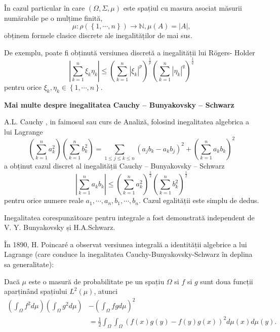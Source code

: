 \documentclass[a4paper,12pt,oneside]{report}
\begin{document}
	În  cazul particular în care \(\left ( \Omega , \Sigma, \mu \right )\) este spațiul cu masura asociat măsurii numărabile pe o mulțime finită, \[\mu  : \rho \left ( \left \{ 1,\cdots, n \right \} \right )\rightarrow \mathbb{N}, \mu \left ( A \right ) = \left | A \right |,\]
obținem formele clasice discrete ale inegalităților de mai sus.

De exemplu, poate fi obținută versiunea discretă a inegalității lui R\"{o}gers- Holder
\begin{displaymath}
  \left | \sum_{k=1}^{n} \xi _{k}\eta _{k}\right |\leq \left ( \sum_{k = 1}^{n}\left | \xi _{k}\right |^{p}  \right )^{\frac{1}{p}}\left ( \sum_{k = 1}^{n} \left | \eta _{k} \right |^{q}\right )^{\frac{1}{q}}
\end{displaymath}
pentru  orice \(\xi _{k}, \eta _{k} \in \left \{ 1,\cdots,n \right \}.\)




\textbf{Mai multe despre inegalitatea Cauchy – Bunyakovsky – Schwarz}

A.L. Cauchy , in faimosul sau curs de Analiză, folosind inegalitatea algebrica a  lui Lagrange
\begin{displaymath}
  \left ( \sum_{k = 1}^{n} a_{k}^{2}\right )\left ( \sum_{k = 1}^{n} b_{k}^{2}\right ) =  \sum_{1\leq j\leq k\leq n}\left ( a_{j}b_{k} - a_{k}b_{j} \right )^{2} + \left ( \sum_{k = 1}^{n} a_{k}b_{k}\right )^{2}
\end{displaymath}
a obținut cazul discret al inegalității Cauchy – Bunyakovsky – Schwarz
\begin{displaymath}
  \left | \sum_{k = 1}^{n} a_{k}b_{k} \right |\leq \left ( \sum_{k = 1}^{n}a_{k}^{2} \right )^{\frac{1}{2}}\left ( \sum_{k = 1}^{n}b_{k}^{2} \right )^{\frac{1}{2}}
\end{displaymath}
pentru orice numere reale \(a_{1},\cdots,a_{n}, b_{1},\cdots, b_{n}\). Cazul egalității este simplu de dedus.

Inegalitatea corespunzătoare pentru integrale a fost demonstrată independent de V. Y. Bunyakovsky și H.A.Schwarz.

	În 1890, H. Poincar\'{e} a observat versiunea integrală a identității algebrice a lui Lagrange (care conduce la inegalitatea Cauchy-Bunyakovsky-Schwarz în deplina sa generalitate):

Dacă \(\mu\) este o masură de probabilitate pe un spațiu \(\Omega\) si \(f\) si \(g\) sunt doua funcții aparținând spațiului \(L^{2}\left ( \mu  \right )\), atunci
\begin{displaymath}
\begin{split}
  \left (\int_{\Omega}f^{2}d\mu \right )\left (\int_{\Omega}g^{2}d\mu \right ) &- \left (\int_{\Omega}fgd\mu \right )^{2}\\
   &= \frac{1}{2}\int_{\Omega}\int_{\Omega}\left ( f\left ( x \right )g\left ( y \right ) - f\left ( y \right )g\left ( x \right )\right )^{2}d\mu \left ( x \right )d\mu \left ( y \right ).
  \end{split}
\end{displaymath}
	
\end{document}
